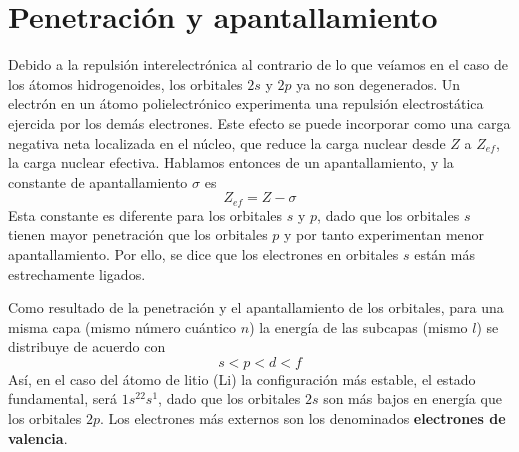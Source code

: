 \section{Penetración y apantallamiento}
Debido a la repulsión interelectrónica al contrario de lo que veíamos en el caso de los átomos hidrogenoides,
los orbitales $2s$ y $2p$ ya no son degenerados. Un electrón en un 
átomo polielectrónico experimenta una repulsión electrostática 
ejercida por los demás electrones. Este efecto se puede incorporar
como una carga negativa neta localizada en el núcleo, que reduce la
carga nuclear desde $Z$ a $Z_{ef}$, la carga nuclear efectiva.
Hablamos entonces de un apantallamiento, y la constante de apantallamiento
$\sigma$ es 
\begin{equation}
    Z_{ef}= Z-\sigma
\end{equation}
Esta constante es diferente para los orbitales $s$ y $p$, dado
que los orbitales $s$ tienen mayor penetración que los orbitales
$p$ y por tanto experimentan menor apantallamiento. Por ello, 
se dice que los electrones en orbitales $s$ están más estrechamente
ligados.

Como resultado de la penetración y el apantallamiento de los orbitales,
para una misma capa (mismo número cuántico $n$) la energía de las 
subcapas (mismo $l$) se distribuye de acuerdo con
\begin{equation*}
    s<p<d<f
\end{equation*}
Así, en el caso del átomo de litio (Li) la configuración más
estable, el estado fundamental, será $1s^22s^1$, dado que los
orbitales $2s$ son más bajos en energía que los orbitales $2p$.
Los electrones más externos son los denominados \textbf{electrones 
de valencia}.

